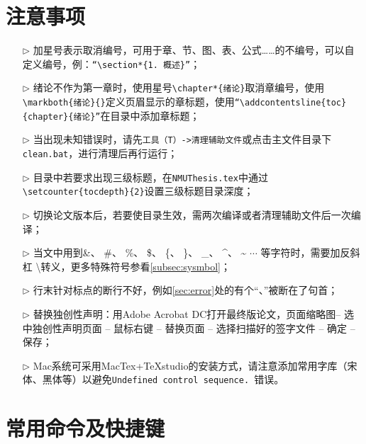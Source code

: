 \section{注意事项}
\begin{itemize}
  \item[$\triangleright$] 加星号表示取消编号，可用于章、节、图、表、公式……的不编号，可以自定义编号，例：\verb|“\section*{1. 概述}”|；
  \item[$\triangleright$] 绪论不作为第一章时，使用星号\verb|\chapter*{绪论}|取消章编号，使用\verb|\markboth{绪论}{}|定义页眉显示的章标题，使用\verb|“\addcontentsline{toc}{chapter}{绪论}”|在目录中添加章标题；
  \item[$\triangleright$] 当出现未知错误时，请先\verb|工具（T）->清理辅助文件|或点击主文件目录下\verb|clean.bat|，进行清理后再行运行；
  \item[$\triangleright$] 目录中若要求出现三级标题，在\verb|NMUThesis.tex|中通过\verb|\setcounter{tocdepth}{2}|设置三级标题目录深度；
  \item[$\triangleright$] 切换论文版本后，若要使目录生效，需两次编译或者清理辅助文件后一次编译；
  \item[$\triangleright$] 当文中用到\&、 \#、 \%、 \$、 \{、 \}、 \_、 \^{}、 \~{} $\cdots$ 等字符时，需要加反斜杠 \textbackslash 转义，更多特殊符号参看\ref{subsec:sysmbol}；
  \item[$\triangleright$] 行末针对标点的断行不好，例如\ref{sec:error}处的有个“、”被断在了句首；
  \item[$\triangleright$] 替换独创性声明：用Adobe Acrobat DC打开最终版论文，页面缩略图-- 选中独创性声明页面 -- 鼠标右键 -- 替换页面 -- 选择扫描好的签字文件 -- 确定 -- 保存；
  \item[$\triangleright$] Mac系统可采用MacTex+TeXstudio的安装方式，请注意添加常用字库（宋体、黑体等）以避免\verb|Undefined control sequence. |错误。
\end{itemize}

\section{常用命令及快捷键}

